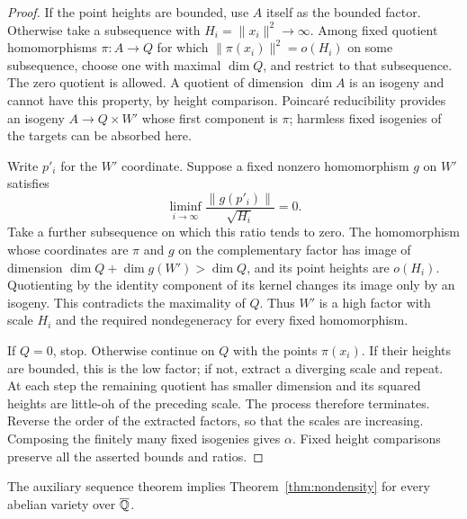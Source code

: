 \begin{proof}
If the point heights are bounded, use $A$ itself as the bounded factor.
Otherwise take a subsequence with $H_i=\|x_i\|^2\to\infty$.
Among fixed quotient homomorphisms $\pi:A\to Q$ for which
$\|\pi(x_i)\|^2=o(H_i)$ on some subsequence, choose one with
maximal $\dim Q$, and restrict to that subsequence. The zero quotient
is allowed. A quotient of dimension $\dim A$ is an isogeny and cannot
have this property, by height comparison. Poincar\'e reducibility
provides an isogeny $A\to Q\times W'$ whose first component is
$\pi$; harmless fixed isogenies of the targets can be absorbed here.

Write $p'_i$ for the $W'$ coordinate. Suppose a fixed nonzero
homomorphism $g$ on $W'$ satisfies
\[
 \liminf_{i\to\infty}\frac{\|g(p'_i)\|}{\sqrt{H_i}}=0.
\]
Take a further subsequence on which this ratio tends to zero. The homomorphism
whose coordinates are $\pi$ and $g$ on the complementary factor has
image of dimension $\dim Q+\dim g(W')>\dim Q$, and its point
heights are $o(H_i)$. Quotienting by the identity component of its
kernel changes its image only by an isogeny. This contradicts the
maximality of $Q$. Thus $W'$ is a high factor with scale $H_i$ and the
required nondegeneracy for every fixed homomorphism.

If $Q=0$, stop. Otherwise continue on $Q$ with the points
$\pi(x_i)$. If their heights are
bounded, this is the low factor; if not, extract a diverging scale and
repeat. At each step the remaining quotient has smaller dimension and
its squared heights are little-oh of the preceding scale. The process
therefore terminates. Reverse the order of the extracted factors, so
that the scales are increasing. Composing the finitely many fixed
isogenies gives $\alpha$. Fixed height comparisons preserve all the
asserted bounds and ratios.
\end{proof}

\begin{proposition}
\label{prop:sequence-implies-nondensity}
The auxiliary sequence theorem implies Theorem~\ref{thm:nondensity}
for every abelian variety over $\overline{\mathbb Q}$.
\end{proposition}

